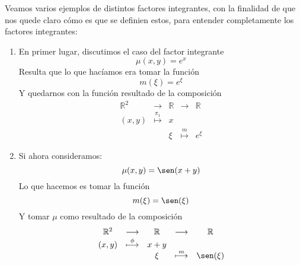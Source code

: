 \begin{ejemplo}
    Veamos varios ejemplos de distintos factores integrantes, con la finalidad de que nos quede claro cómo es que se definien estos, para entender completamente los factores integrantes:
    \begin{enumerate}
        \item En primer lugar, discutimos el caso del factor integrante
            \begin{equation*}
                \mu(x,y) = e^x
            \end{equation*}
            Resulta que lo que hacíamos era tomar la función 
            \begin{equation*}
                m(\xi) = e^\xi
            \end{equation*}
            Y quedarnos con la función resultado de la composición
            \begin{equation*}
                \begin{array}{ccccc}
                    \mathbb{R}^2 & \longrightarrow & \mathbb{R} & \longrightarrow & \mathbb{R}\\
                    (x,y) & \stackrel{\pi_1}{\longmapsto} & x \\
                          & & \xi & \stackrel{m}{\longmapsto} & e^\xi
                \end{array}
            \end{equation*}
        \item Si ahora consideramos:
            \begin{equation*}
                \mu(x,y) = \sen(x+y)
            \end{equation*}
            Lo que hacemos es tomar la función
            \begin{equation*}
                m(\xi) = \sen(\xi)
            \end{equation*}
            Y tomar $\mu$ como resultado de la composición
            \begin{equation*}
                \begin{array}{ccccc}
                    \mathbb{R}^2 & \longrightarrow & \mathbb{R} & \longrightarrow & \mathbb{R}\\
                    (x,y) & \stackrel{\phi}{\longmapsto} & x+y \\
                          & & \xi & \stackrel{m}{\longmapsto} & \sen(\xi)
                \end{array}
            \end{equation*}

\end{enumerate}
\end{ejemplo}
